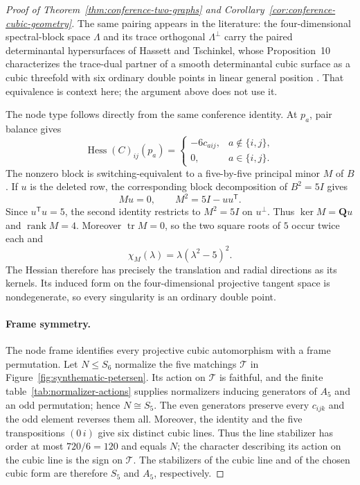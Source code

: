 \documentclass[11pt]{article}
\theoremstyle{definition}
\theoremstyle{remark}
\begin{document}
\begin{proof}[Proof of Theorem~\ref{thm:conference-two-graphs} and
Corollary~\ref{cor:conference-cubic-geometry}]
The same pairing appears in the literature: the four-dimensional
spectral-block space $\Lambda$ and its trace orthogonal $\Lambda^\perp$
carry the paired
determinantal hypersurfaces of Hassett and Tschinkel, whose Proposition~10
characterizes the trace-dual partner of a smooth determinantal cubic
surface as a cubic threefold with six ordinary double points in linear
general position \cite[\S3, Proposition~10]{HassettTschinkel2010}.  That
equivalence is context here; the argument above does not use it.

The node type follows directly from the same
conference identity. At $p_a$, pair balance gives
\[
 \operatorname{Hess}(C)_{ij}(p_a)=
 \begin{cases}
 -6c_{aij},&a\notin\{i,j\},\\
 0,&a\in\{i,j\}.
 \end{cases}
\]
The nonzero block is switching-equivalent to a five-by-five principal
minor $M$ of $B$.  If $u$ is the deleted row, the corresponding block
decomposition of $B^2=5I$ gives
\[
 Mu=0,\qquad M^2=5I-uu^{\mathsf T}.
\]
Since $u^{\mathsf T}u=5$, the second identity restricts to $M^2=5I$ on
$u^\perp$.  Thus $\ker M=\mathbf Q u$ and $\operatorname{rank}M=4$.
Moreover $\operatorname{tr}M=0$, so the two square roots of $5$ occur
twice each and
\[
 \chi_M(\lambda)=\lambda(\lambda^2-5)^2.
\]
The Hessian therefore has precisely the translation and radial directions
as its kernels.  Its induced form on the four-dimensional projective tangent
space is nondegenerate, so every singularity is an ordinary double point.

\paragraph{Frame symmetry.}
The node frame identifies every projective cubic automorphism with a frame
permutation.  Let $N\le S_6$ normalize the five matchings $\mathcal T$ in
Figure~\ref{fig:synthematic-petersen}.  Its action on $\mathcal T$ is
faithful, and the finite table~\eqref{tab:normalizer-actions} supplies
normalizers inducing generators
of $A_5$ and an odd permutation; hence $N\cong S_5$.  The even generators
preserve every $c_{ijk}$ and the odd element reverses them all.  Moreover,
the identity and the five transpositions $(0\,i)$ give six distinct cubic
lines.  Thus the line stabilizer has order at most $720/6=120$ and equals
$N$; the character describing its action on the cubic line is the sign on
$\mathcal T$.  The stabilizers of the cubic line and of the chosen cubic form
are therefore $S_5$ and $A_5$, respectively.


\end{proof}
\end{document}
